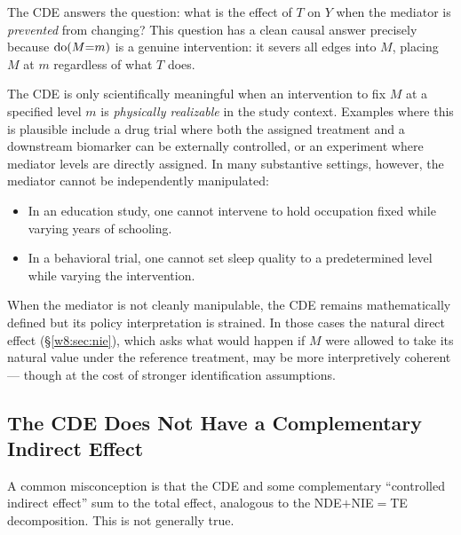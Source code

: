 \documentclass[master.tex]{subfiles}
\begin{document}
The CDE answers the question: what is the effect of $T$ on $Y$ when
the mediator is \emph{prevented} from changing?  This question has a
clean causal answer precisely because $\mathrm{do}(M{=}m)$ is a genuine
intervention: it severs all edges into $M$, placing $M$ at $m$
regardless of what $T$ does.

\begin{remark}
The CDE is only scientifically meaningful when an intervention to fix
$M$ at a specified level $m$ is \emph{physically realizable} in the
study context.  Examples where this is plausible include a drug trial
where both the assigned treatment and a downstream biomarker can be
externally controlled, or an experiment where mediator levels are
directly assigned.  In many substantive settings, however, the mediator
cannot be independently manipulated:
\begin{itemize}
  \item In an education study, one cannot intervene to hold occupation
    fixed while varying years of schooling.
  \item In a behavioral trial, one cannot set sleep quality to a
    predetermined level while varying the intervention.
\end{itemize}
When the mediator is not cleanly manipulable, the CDE remains
mathematically defined but its policy interpretation is strained.  In
those cases the natural direct effect (§\ref{w8:sec:nie}), which asks
what would happen if $M$ were allowed to take its natural value under
the reference treatment, may be more interpretively coherent ---
though at the cost of stronger identification assumptions.
\end{remark}

\subsection{The CDE Does Not Have a Complementary Indirect Effect}

A common misconception is that the CDE and some complementary
``controlled indirect effect'' sum to the total effect, analogous to
the NDE$+$NIE$=$TE decomposition.  This is not generally true.
\end{document}

